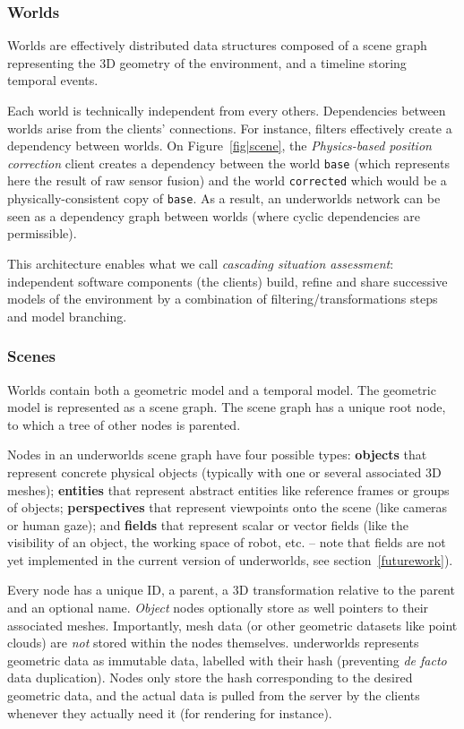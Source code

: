 \documentclass[letterpaper, 10 pt, conference]{ieeeconf}  %
\newcommand{\uwds}{{\sc underworlds}\xspace}
\begin{document}
\subsubsection{Worlds}

Worlds are effectively distributed data structures composed of a scene graph
representing the 3D geometry of the environment, and a timeline storing temporal
events.

Each world is technically independent from every others. Dependencies between
worlds arise from the clients' connections. For instance, filters effectively
create a dependency between worlds. On Figure~\ref{fig|scene}, the \textit{Physics-based
position correction} client creates a dependency between the world {\tt base} (which
represents here the result of raw sensor fusion) and the world {\tt corrected}
which would be a physically-consistent copy of {\tt base}.
As a result, an \uwds network can be seen as a dependency graph between worlds (where
cyclic dependencies are permissible).

This architecture enables what we call \emph{cascading situation assessment}:
independent software components (the clients) build, refine and share successive
models of the environment by a combination of filtering/transformations steps
and model branching.

\subsubsection{Scenes}

Worlds contain both a geometric model and a temporal model. The geometric
model is represented as a scene graph. The scene graph has a unique root node,
to which a tree of other nodes is parented.

Nodes in an \uwds scene graph have four possible types: \textbf{objects} that
represent concrete physical objects (typically with one or several associated 3D
meshes); \textbf{entities} that represent abstract entities like reference
frames or groups of objects; \textbf{perspectives} that represent viewpoints
onto the scene (like cameras or human gaze); and \textbf{fields} that represent
scalar or vector fields (like the visibility of an object, the working space of
robot, etc. -- note that fields are not yet implemented in the current version
of \uwds, see section~\ref{futurework}).

Every node has a unique ID, a parent, a 3D transformation relative to the parent
and an optional name. \emph{Object} nodes optionally store as well pointers to
their associated meshes. Importantly, mesh data (or other geometric datasets
like point clouds) are \emph{not} stored within the nodes themselves. \uwds
represents geometric data as immutable data, labelled with their hash
(preventing \textit{de facto} data duplication).  Nodes only store the hash
corresponding to the desired geometric data, and the actual data is pulled from
the server by the clients whenever they actually need it (for rendering for
instance).
\end{document}
